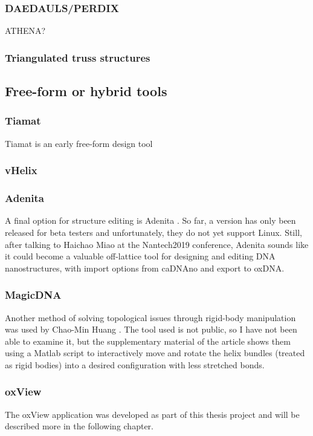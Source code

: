 \subsubsection{DAEDAULS/PERDIX}
ATHENA? %
\subsubsection{Triangulated truss structures}

\subsection{Free-form or hybrid tools}

\subsubsection{Tiamat}
Tiamat is an early free-form design tool

\subsubsection{vHelix}

\subsubsection{Adenita}
A final option for structure editing is Adenita \cite{miao_tvcg_2018}. So far, a version has only been released for beta testers and unfortunately, they do not yet support Linux. Still, after talking to Haichao Miao at the Nantech2019 conference, Adenita sounds like it could become a valuable off-lattice tool for designing and editing DNA nanostructures, with import options from caDNAno and export to oxDNA.

\subsubsection{MagicDNA}
Another method of solving topological issues through rigid-body manipulation was used by Chao-Min Huang \cite{huang2019uncertainty}. The tool used is not public, so I have not been able to examine it, but the supplementary material of the article shows them using a Matlab script to interactively move and rotate the helix bundles (treated as rigid bodies) into a desired configuration with less stretched bonds.

\subsubsection{oxView}
The oxView application was developed as part of this thesis project and will be described more in the following chapter.